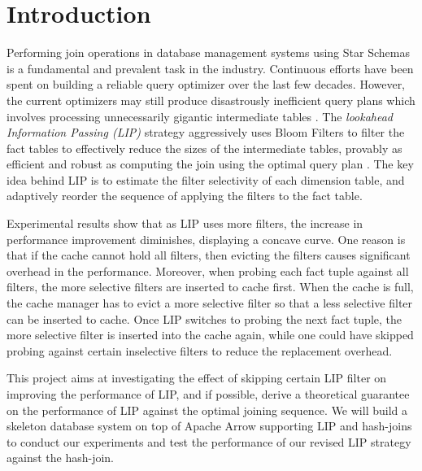 \documentclass[10pt]{article}
\begin{document}
\newpage
\maketitle




\section{Introduction}

Performing join operations in database management systems using Star Schemas is a fundamental and prevalent task in the industry. Continuous efforts have been spent on building a reliable query optimizer over the last few decades. However, the current optimizers may still produce disastrously inefficient query plans which involves processing unnecessarily gigantic intermediate tables \cite{leis2015good,rabl2013variations}. The \textit{lookahead Information Passing (LIP)} strategy aggressively uses Bloom Filters to filter the fact tables to effectively reduce the sizes of the intermediate tables, provably as efficient and robust as computing the join using the optimal query plan \cite{zhu2017looking}. The key idea behind LIP is to estimate the filter selectivity of each dimension table, and adaptively reorder the sequence of applying the filters to the fact table.  

Experimental results show that as LIP uses more filters, the increase in performance improvement diminishes, displaying a concave curve. One reason is that if the cache cannot hold all filters, then evicting the filters causes significant overhead in the performance. Moreover, when probing each fact tuple against all filters, the more selective filters are inserted to cache first. When the cache is full, the cache manager has to evict a more selective filter so that a less selective filter can be inserted to cache. Once LIP switches to probing the next fact tuple, the more selective filter is inserted into the cache again, while one could have skipped probing against certain inselective filters to reduce the replacement overhead.



This project aims at investigating the effect of skipping certain LIP filter on improving the performance of LIP, and if possible, derive a theoretical guarantee on the performance of LIP against the optimal joining sequence. We will build a skeleton database system on top of Apache Arrow supporting LIP and hash-joins to conduct our experiments and test the performance of our revised LIP strategy against the hash-join.
\end{document}
